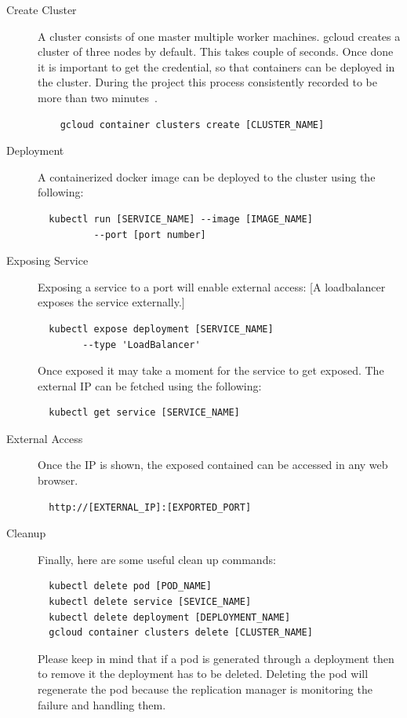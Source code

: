 \begin{description}
\item[Create Cluster] A cluster consists of one master multiple worker
machines. gcloud creates a cluster of three nodes by default. This takes
couple of seconds. Once done it is important to get the credential, so that
containers can be deployed in the cluster. During the project this process
consistently recorded to be more than two
minutes~\cite{hid-sp18-417-cluster-creation-video}.

  \begin{verbatim}
    gcloud container clusters create [CLUSTER_NAME]
  \end{verbatim}
\item[Deployment] A containerized docker image can be deployed to the cluster
using the following:
\begin{verbatim}
  kubectl run [SERVICE_NAME] --image [IMAGE_NAME] 
          --port [port number]
\end{verbatim}
\item [Exposing Service] Exposing a service to a port will enable external
access: [A loadbalancer exposes the service externally.]
\begin{verbatim}
  kubectl expose deployment [SERVICE_NAME] 
        --type 'LoadBalancer'
\end{verbatim}

Once exposed it may take a moment for the service to get exposed. The external
IP can be fetched using the following:

\begin{verbatim}
  kubectl get service [SERVICE_NAME]
\end{verbatim}

\item [External Access] Once the IP is shown, the exposed contained can be
accessed in any web browser.
\begin{verbatim}
  http://[EXTERNAL_IP]:[EXPORTED_PORT]
\end{verbatim}

\item [Cleanup] Finally, here are some useful clean up commands:
\begin{verbatim}
  kubectl delete pod [POD_NAME]
  kubectl delete service [SEVICE_NAME]
  kubectl delete deployment [DEPLOYMENT_NAME]
  gcloud container clusters delete [CLUSTER_NAME]
\end{verbatim}

  Please keep in mind that if a pod is generated through a deployment then to
  remove it the deployment has to be deleted. Deleting the pod will regenerate
  the pod because the replication manager is monitoring the failure and
  handling them.

\end{description}


